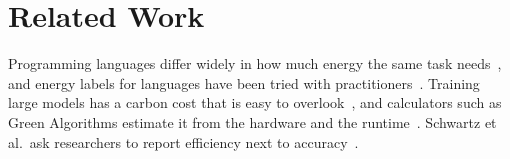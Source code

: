 
\section{Related Work}\label{sec:related}

Programming languages differ widely in how much energy the same task
needs~\cite{pereira2017energy}, and energy labels for languages have been
tried with practitioners~\cite{pereira2024labels}.
Training large models has a carbon cost that is easy to
overlook~\cite{strubell2019energy,patterson2021carbon}, and calculators such as
Green Algorithms estimate it from the hardware and the
runtime~\cite{lannelongue2021green}.
Schwartz et al.\ ask researchers to report efficiency next to
accuracy~\cite{schwartz2020green}.
